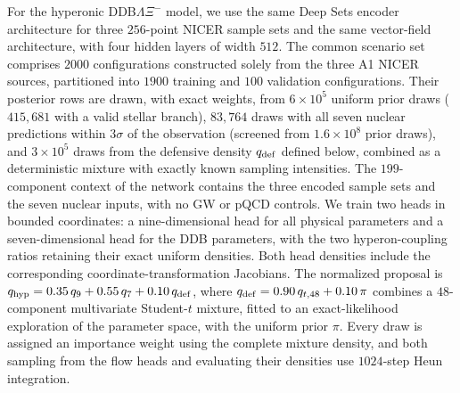 \documentclass[aps,prd,twocolumn,superscriptaddress,nofootinbib,longbibliography]{revtex4-2}
\begin{document}
For the hyperonic DDB$\Lambda\Xi^-$ model, we use the
same Deep Sets encoder architecture for three $256$-point NICER sample sets and the
same vector-field architecture, with four hidden layers of width $512$. The
common scenario set comprises $2000$ configurations constructed solely from
the three A1 NICER sources, partitioned into $1900$ training and $100$
validation configurations. Their posterior rows are drawn, with exact weights,
from $6\times10^{5}$ uniform prior draws ($415{,}681$ with a valid stellar
branch), $83{,}764$ draws with all seven nuclear predictions within $3\sigma$
of the observation (screened from $1.6\times10^{8}$ prior draws), and
$3\times10^{5}$ draws from the defensive density $q_{\rm def}$ defined below,
combined as a deterministic mixture with exactly known sampling intensities. The
$199$-component context of the network contains the three
encoded sample sets and the seven nuclear inputs, with no GW or pQCD controls. We
train two heads in bounded coordinates: a nine-dimensional head for all
physical parameters and a seven-dimensional head for the DDB parameters, with
the two hyperon-coupling ratios retaining their exact uniform densities. Both
head densities include the corresponding coordinate-transformation
Jacobians. The normalized proposal is
$q_{\rm hyp}=0.35\,q_9+0.55\,q_7+0.10\,q_{\rm def}$, where
$q_{\rm def}=0.90\,q_{t,48}+0.10\,\pi$ combines a $48$-component multivariate
Student-$t$ mixture, fitted to an exact-likelihood exploration of the parameter
space, with the uniform prior $\pi$. Every draw is assigned an importance
weight using the complete mixture density, and both sampling from the flow
heads and evaluating their densities use $1024$-step Heun integration.
\end{document}
